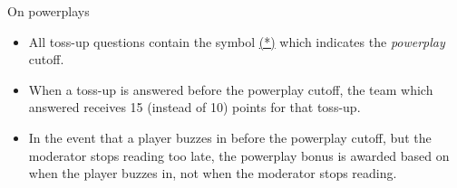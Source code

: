 \vspace*{0.3 cm}
On powerplays
\begin{itemize}
    \item All toss-up questions contain the symbol \underline{(*)} which indicates the \textit{powerplay} cutoff.
    \item When a toss-up is answered before the powerplay cutoff, the team which answered receives 15 (instead of 10) points for that toss-up.
    \item In the event that a player buzzes in before the powerplay cutoff, but the moderator stops reading too late, the powerplay bonus is awarded based on when the player buzzes in, not when the moderator stops reading.
\end{itemize}
